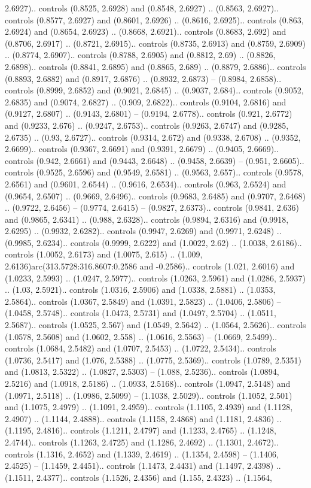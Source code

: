 2.6927).. controls (0.8525, 2.6928) and (0.8548, 2.6927) .. (0.8563, 2.6927).. controls (0.8577, 2.6927) and (0.8601, 2.6926) .. (0.8616, 2.6925).. controls (0.863, 2.6924) and (0.8654, 2.6923) .. (0.8668, 2.6921).. controls (0.8683, 2.692) and (0.8706, 2.6917) .. (0.8721, 2.6915).. controls (0.8735, 2.6913) and (0.8759, 2.6909) .. (0.8774, 2.6907).. controls (0.8788, 2.6905) and (0.8812, 2.69) .. (0.8826, 2.6898).. controls (0.8841, 2.6895) and (0.8865, 2.689) .. (0.8879, 2.6886).. controls (0.8893, 2.6882) and (0.8917, 2.6876) .. (0.8932, 2.6873) -- (0.8984, 2.6858).. controls (0.8999, 2.6852) and (0.9021, 2.6845) .. (0.9037, 2.684).. controls (0.9052, 2.6835) and (0.9074, 2.6827) .. (0.909, 2.6822).. controls (0.9104, 2.6816) and (0.9127, 2.6807) .. (0.9143, 2.6801) -- (0.9194, 2.6778).. controls (0.921, 2.6772) and (0.9233, 2.676) .. (0.9247, 2.6753).. controls (0.9263, 2.6747) and (0.9285, 2.6735) .. (0.93, 2.6727).. controls (0.9314, 2.672) and (0.9338, 2.6708) .. (0.9352, 2.6699).. controls (0.9367, 2.6691) and (0.9391, 2.6679) .. (0.9405, 2.6669).. controls (0.942, 2.6661) and (0.9443, 2.6648) .. (0.9458, 2.6639) -- (0.951, 2.6605).. controls (0.9525, 2.6596) and (0.9549, 2.6581) .. (0.9563, 2.657).. controls (0.9578, 2.6561) and (0.9601, 2.6544) .. (0.9616, 2.6534).. controls (0.963, 2.6524) and (0.9654, 2.6507) .. (0.9669, 2.6496).. controls (0.9683, 2.6485) and (0.9707, 2.6468) .. (0.9722, 2.6456) -- (0.9774, 2.6415) -- (0.9827, 2.6373).. controls (0.9841, 2.636) and (0.9865, 2.6341) .. (0.988, 2.6328).. controls (0.9894, 2.6316) and (0.9918, 2.6295) .. (0.9932, 2.6282).. controls (0.9947, 2.6269) and (0.9971, 2.6248) .. (0.9985, 2.6234).. controls (0.9999, 2.6222) and (1.0022, 2.62) .. (1.0038, 2.6186).. controls (1.0052, 2.6173) and (1.0075, 2.615) .. (1.009, 2.6136)arc(313.5728:316.8607:0.2586 and -0.2586).. controls (1.021, 2.6016) and (1.0233, 2.5993) .. (1.0247, 2.5977).. controls (1.0263, 2.5961) and (1.0286, 2.5937) .. (1.03, 2.5921).. controls (1.0316, 2.5906) and (1.0338, 2.5881) .. (1.0353, 2.5864).. controls (1.0367, 2.5849) and (1.0391, 2.5823) .. (1.0406, 2.5806) -- (1.0458, 2.5748).. controls (1.0473, 2.5731) and (1.0497, 2.5704) .. (1.0511, 2.5687).. controls (1.0525, 2.567) and (1.0549, 2.5642) .. (1.0564, 2.5626).. controls (1.0578, 2.5608) and (1.0602, 2.558) .. (1.0616, 2.5563) -- (1.0669, 2.5499).. controls (1.0684, 2.5482) and (1.0707, 2.5453) .. (1.0722, 2.5434).. controls (1.0736, 2.5417) and (1.076, 2.5388) .. (1.0775, 2.5369).. controls (1.0789, 2.5351) and (1.0813, 2.5322) .. (1.0827, 2.5303) -- (1.088, 2.5236).. controls (1.0894, 2.5216) and (1.0918, 2.5186) .. (1.0933, 2.5168).. controls (1.0947, 2.5148) and (1.0971, 2.5118) .. (1.0986, 2.5099) -- (1.1038, 2.5029).. controls (1.1052, 2.501) and (1.1075, 2.4979) .. (1.1091, 2.4959).. controls (1.1105, 2.4939) and (1.1128, 2.4907) .. (1.1144, 2.4888).. controls (1.1158, 2.4868) and (1.1181, 2.4836) .. (1.1195, 2.4816).. controls (1.1211, 2.4797) and (1.1233, 2.4765) .. (1.1248, 2.4744).. controls (1.1263, 2.4725) and (1.1286, 2.4692) .. (1.1301, 2.4672).. controls (1.1316, 2.4652) and (1.1339, 2.4619) .. (1.1354, 2.4598) -- (1.1406, 2.4525) -- (1.1459, 2.4451).. controls (1.1473, 2.4431) and (1.1497, 2.4398) .. (1.1511, 2.4377).. controls (1.1526, 2.4356) and (1.155, 2.4323) .. (1.1564, 